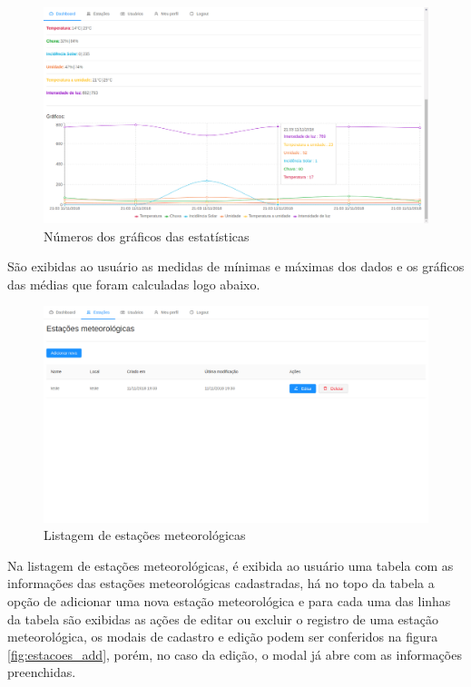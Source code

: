 \begin{figure}[H]
    \centering
    \caption{Números dos gráficos das estatísticas \label{fig:screen_graphs3}}
    \includegraphics[scale=0.3]{telas/grafico3.png}
    \hfill
{}
\end{figure}

São exibidas ao usuário as medidas de mínimas e máximas dos dados e os gráficos das médias que foram calculadas logo abaixo.

\begin{figure}[H]
    \centering
    \caption{Listagem de estações meteorológicas}
    \includegraphics[scale=0.3]{telas/estacoes.png}
    \hfill
{}
\end{figure}

Na listagem de estações meteorológicas, é exibida ao usuário uma tabela com as informações das estações meteorológicas cadastradas, há no topo da tabela a opção de adicionar uma nova estação meteorológica e para cada uma das linhas da tabela são exibidas as ações de editar ou excluir o registro de uma estação meteorológica, os modais de cadastro e edição podem ser conferidos na figura \ref{fig:estacoes_add}, porém, no caso da edição, o modal já abre com as informações preenchidas.

